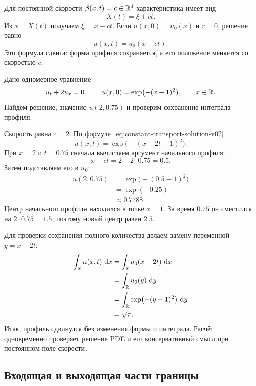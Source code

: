 Для постоянной скорости $\beta(x,t)=c\in\mathbb{R}^d$ характеристика имеет вид
\[
X(t)=\xi+ct.
\]
Из $x=X(t)$ получаем $\xi=x-ct$. Если $u(x,0)=u_0(x)$ и $r=0$, решение равно
\begin{equation}
\label{eq:constant-transport-solution-v02}
u(x,t)=u_0(x-ct).
\end{equation}
Это формула сдвига: форма профиля сохраняется, а его положение меняется со скоростью $c$.

\begin{problem}
Дано одномерное уравнение
\begin{equation}
\label{eq:transport-calculation-problem-v02}
u_t+2u_x=0,
\qquad
u(x,0)=\exp\bigl(-(x-1)^2\bigr),
\qquad
x\in\mathbb{R}.
\end{equation}
Найдём решение, значение $u(2,0.75)$ и проверим сохранение интеграла профиля.
\end{problem}

Скорость равна $c=2$. По формуле~\eqref{eq:constant-transport-solution-v02}
\begin{equation}
\label{eq:transport-calculation-solution-v02}
u(x,t)
=
\exp\bigl(-(x-2t-1)^2\bigr).
\end{equation}
При $x=2$ и $t=0.75$ сначала вычисляем аргумент начального профиля:
\[
x-ct=2-2\cdot0.75=0.5.
\]
Затем подставляем его в $u_0$:
\begin{align}
u(2,0.75)
&=
\exp\bigl(-(0.5-1)^2\bigr)
\\
&=
\exp(-0.25)
\\
&\approx0.7788.
\end{align}
Центр начального профиля находился в точке $x=1$. За время $0.75$ он сместился на $2\cdot0.75=1.5$, поэтому новый центр равен $2.5$.

Для проверки сохранения полного количества делаем замену переменной $y=x-2t$:
\begin{align}
\int_{\mathbb{R}}u(x,t)\,\mathop{}\!\mathrm{d} x
&=
\int_{\mathbb{R}}u_0(x-2t)\,\mathop{}\!\mathrm{d} x
\\
&=
\int_{\mathbb{R}}u_0(y)\,\mathop{}\!\mathrm{d} y
\\
&=
\int_{\mathbb{R}}\exp\bigl(-(y-1)^2\bigr)\,\mathop{}\!\mathrm{d} y
\\
&=
\sqrt{\pi}.
\end{align}
Итак, профиль сдвинулся без изменения формы и интеграла. Расчёт одновременно проверяет решение PDE и его консервативный смысл при постоянном поле скорости.

\subsection{Входящая и выходящая части границы}

